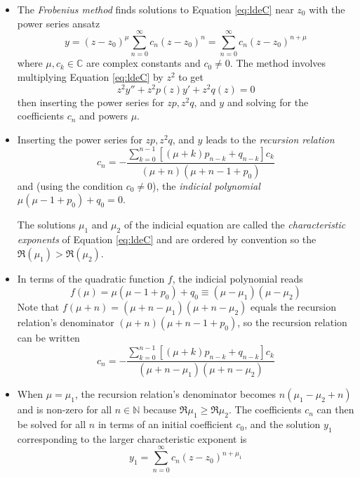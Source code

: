 \documentclass[11pt, a4paper]{article}
\newcommand{\C}{\mathbb{C}} %
\begin{document}
\begin{itemize}
	\item The \textit{Frobenius method} finds solutions to Equation \ref{eq:ldeC} near $ z_{0} $ with the power series ansatz 
	\begin{equation*}
		y = (z-z_{0})^{\mu}\sum_{n=0}^{\infty}c_n(z-z_0)^n = \sum_{n=0}^{\infty}c_n(z-z_0)^{n+\mu}
	\end{equation*}
	where $ \mu, c_{k} \in \C $ are complex constants and $ c_{0} \neq 0 $. The method involves multiplying Equation \ref{eq:ldeC} by $ z^{2} $ to get
	\begin{equation*}
		z^{2} y'' + z^{2} p(z) y' + z^{2} q(z) = 0
	\end{equation*}
	then inserting the power series for $ z p, z^{2} q $, and $ y $ and solving for the coefficients $ c_n $ and powers $ \mu $.
	
	\item Inserting the power series for $ z p, z^{2} q $, and $ y $ leads to the \textit{recursion relation}
	\begin{equation*}
		c_{n} = - \frac{\sum_{k=0}^{n-1}\left[(\mu + k)p_{n-k} + q_{n-k} \right]c_{k}}{(\mu + n)(\mu + n - 1 + p_{0})}
	\end{equation*}
	and (using the condition $ c_{0} \neq 0 $), the \textit{indicial polynomial} $ \mu(\mu-1 + p_{0}) + q_{0} = 0$.
	
	The solutions $ \mu_{1} $ and $ \mu_{2} $ of the indicial equation are called the \textit{characteristic exponents} of Equation \ref{eq:ldeC} and are ordered by convention so the $ \Re(\mu_{1}) > \Re(\mu_{2}) $.
	
	\item In terms of the quadratic function $ f $, the indicial polynomial reads
	\begin{equation*}
		f(\mu) = \mu(\mu -1 + p_{0}) + q_{0} \equiv (\mu - \mu_{1})(\mu - \mu_{2})
	\end{equation*}
	Note that $ f(\mu + n) = (\mu + n - \mu_{1})(\mu + n - \mu_{2}) $ equals the recursion relation's denominator $ (\mu + n)(\mu + n - 1 + p_{0}) $, so the recursion relation can be written
	\begin{equation*}
		c_{n} = - \frac{\sum_{k=0}^{n-1}\left[(\mu + k)p_{n-k} + q_{n-k} \right]c_{k}}{(\mu + n - \mu_{1})(\mu + n - \mu_{2})}
	\end{equation*}
	
	\item When $ \mu = \mu_{1} $, the recursion relation's denominator becomes $ n(\mu_{1} - \mu_{2} + n) $ and is non-zero for all $ n \in \mathbb{N} $ because $ \Re \mu_{1} \geq \Re \mu_{2} $. The coefficients $ c_{n} $ can then be solved for all $ n $ in terms of an initial coefficient $ c_{0} $, and the solution $ y_{1} $ corresponding to the larger characteristic exponent is
	\begin{equation*}
		y_{1} = \sum_{n=0}^{\infty}c_n(z-z_0)^{n+\mu_{1}} 
	\end{equation*}
	

\end{itemize}
\end{document}
